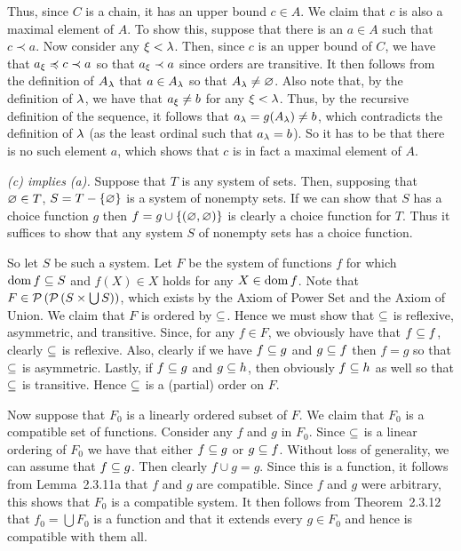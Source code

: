 \begin{questions}
{{    Thus, since $C$ is a chain, it has an upper bound $c \in A$.
    We claim that $c$ is also a maximal element of $A$.
    To show this, suppose that there is an $a \in A$ such that $c \prec a$.
    Now consider any $\x < \l$.
    Then, since $c$ is an upper bound of $C$, we have that $a_\x \prece c \prec a$ so that $a_\x \prec a$ since orders are transitive.
    It then follows from the definition of $A_\l$ that $a \in A_\l$ so that $A_\l \neq \es$.
    Also note that, by the definition of $\l$, we have that $a_\x \neq b$ for any $\x < \l$.
    Thus, by the recursive definition of the sequence, it follows that $a_\l = g(A_\l) \neq b$, which contradicts the definition of $\l$ (as the least ordinal such that $a_\l = b$).
    So it has to be that there is no such element $a$, which shows that $c$ is in fact a maximal element of $A$.

    \emph{(c) implies (a).}
    Suppose that $T$ is any system of sets.
    Then, supposing that $\es \in T$, $S = T - \braces{\es}$ is a system of nonempty sets.
    If we can show that $S$ has a choice function $g$ then $f = g \cup \braces{(\es, \es)}$ is clearly a choice function for $T$.
    Thus it suffices to show that any system $S$ of nonempty sets has a choice function.

    So let $S$ be such a system.
    Let $F$ be the system of functions $f$ for which $\dom{f} \ss S$ and $f(X) \in X$ holds for any $X \in \dom{f}$.
    Note that $F \in \pset{\pset{S \times \bigcup S}}$, which exists by the Axiom of Power Set and the Axiom of Union.
    We claim that $F$ is ordered by $\ss$.
    Hence we must show that $\ss$ is reflexive, asymmetric, and transitive.
    Since, for any $f \in F$, we obviously have that $f \ss f$, clearly $\ss$ is reflexive.
    Also, clearly if we have $f \ss g$ and $g \ss f$ then $f=g$ so that $\ss$ is asymmetric.
    Lastly, if $f \ss g$ and $g \ss h$, then obviously $f \ss h$ as well so that $\ss$ is transitive.
    Hence $\ss$ is a (partial) order on $F$.

    Now suppose that $F_0$ is a linearly ordered subset of $F$.
    We claim that $F_0$ is a compatible set of functions.
    Consider any $f$ and $g$ in $F_0$.
    Since $\ss$ is a linear ordering of $F_0$ we have that either $f \ss g$ or $g \ss f$.
    Without loss of generality, we can assume that $f \ss g$.
    Then clearly $f \cup g = g$.
    Since this is a function, it follows from Lemma~2.3.11a that $f$ and $g$ are compatible.
    Since $f$ and $g$ were arbitrary, this shows that $F_0$ is a compatible system.
    It then follows from Theorem~2.3.12 that $f_0 = \bigcup F_0$ is a function and that it extends every $g \in F_0$ and hence is compatible with them all.

}}
\end{questions}

